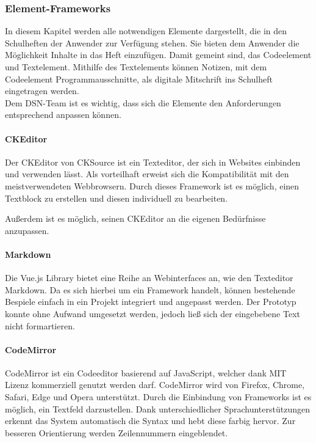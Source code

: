 \subsubsection{Element-Frameworks}
In diesem Kapitel werden alle notwendigen Elemente dargestellt, die in den Schulheften der Anwender zur Verfügung stehen. Sie bieten dem Anwender die Möglichkeit Inhalte in das Heft einzufügen. Damit gemeint sind, das Codeelement und Textelement. Mithilfe des Textelements können Notizen, mit dem Codeelement Programmausschnitte, als digitale Mitschrift ins Schulheft eingetragen werden.\\
Dem DSN-Team ist es wichtig, dass sich die Elemente den Anforderungen entsprechend anpassen können.

\newpage

\paragraph{CKEditor}
Der CKEditor von CKSource ist ein Texteditor, der sich in Websites einbinden und verwenden lässt. Als vorteilhaft erweist sich die Kompatibilität mit den meistverwendeten Webbrowsern. Durch dieses Framework ist es möglich, einen Textblock zu erstellen und diesen individuell zu bearbeiten.

Außerdem ist es möglich, seinen CKEditor an die eigenen Bedürfnisse anzupassen.\cite{CKEDITOR}


\paragraph{Markdown}
Die Vue.js Library bietet eine Reihe an Webinterfaces an, wie den Texteditor Markdown. Da es sich hierbei um ein Framework handelt, können bestehende Bespiele einfach in ein Projekt integriert und angepasst werden. Der Prototyp konnte ohne Aufwand umgesetzt werden, jedoch ließ sich der eingebebene Text nicht formartieren. \cite{MARKDOWN}


\paragraph{CodeMirror}
CodeMirror ist ein Codeeditor basierend auf JavaScript, welcher dank MIT Lizenz kommerziell genutzt werden darf. CodeMirror wird von Firefox, Chrome, Safari, Edge und Opera unterstützt. Durch die Einbindung von Frameworks ist es möglich, ein Textfeld darzustellen. Dank unterschiedlicher Sprachunterstützungen erkennt das System automatisch die Syntax und hebt diese farbig hervor. Zur besseren Orientierung werden Zeilennummern eingeblendet. \cite{CODEMIRROR}

